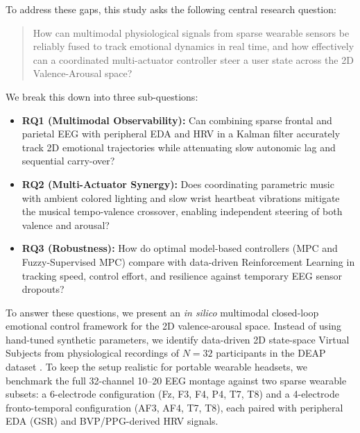 \documentclass[a4paper,fleqn]{cas-dc}
\begin{document}
To address these gaps, this study asks the following central research question:
\begin{quote}
How can multimodal physiological signals from sparse wearable sensors be reliably fused to track emotional dynamics in real time, and how effectively can a coordinated multi-actuator controller steer a user state across the 2D Valence-Arousal space?
\end{quote}
We break this down into three sub-questions:
\begin{itemize}
    \item \textbf{RQ1 (Multimodal Observability):} Can combining sparse frontal and parietal EEG with peripheral EDA and HRV in a Kalman filter accurately track 2D emotional trajectories while attenuating slow autonomic lag and sequential carry-over?
    \item \textbf{RQ2 (Multi-Actuator Synergy):} Does coordinating parametric music with ambient colored lighting and slow wrist heartbeat vibrations mitigate the musical tempo-valence crossover, enabling independent steering of both valence and arousal?
    \item \textbf{RQ3 (Robustness):} How do optimal model-based controllers (MPC and Fuzzy-Supervised MPC) compare with data-driven Reinforcement Learning in tracking speed, control effort, and resilience against temporary EEG sensor dropouts?
\end{itemize}

To answer these questions, we present an \textit{in silico} multimodal closed-loop emotional control framework for the 2D valence-arousal space. Instead of using hand-tuned synthetic parameters, we identify data-driven 2D state-space Virtual Subjects from physiological recordings of $N = 32$ participants in the DEAP dataset \cite{koelstra2012deap}. To keep the setup realistic for portable wearable headsets, we benchmark the full 32-channel 10--20 EEG montage against two sparse wearable subsets: a 6-electrode configuration (Fz, F3, F4, P4, T7, T8) and a 4-electrode fronto-temporal configuration (AF3, AF4, T7, T8), each paired with peripheral EDA (GSR) and BVP/PPG-derived HRV signals.
\end{document}
